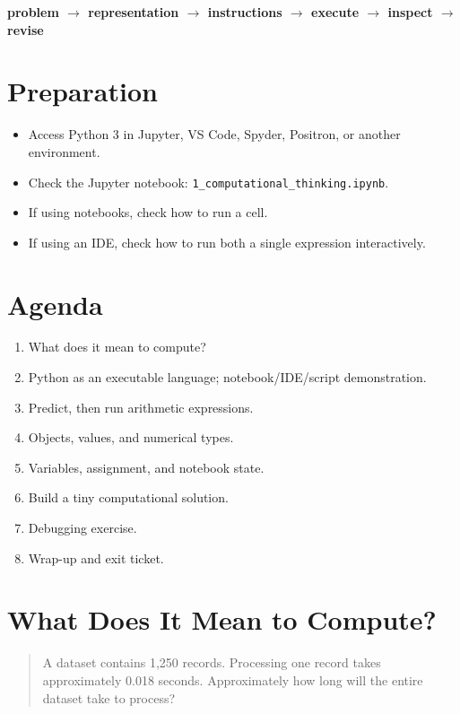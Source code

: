 \documentclass[11pt]{article}
\begin{document}
\begin{center}
\textbf{problem $\rightarrow$ representation $\rightarrow$ instructions $\rightarrow$ execute $\rightarrow$ inspect $\rightarrow$ revise}
\end{center}

\section*{Preparation}

\begin{itemize}
    \item Access Python 3 in Jupyter, VS Code, Spyder, Positron, or another environment.
    \item Check the Jupyter notebook:
    \texttt{1\_computational\_thinking.ipynb}.
    \item If using notebooks, check how to run a cell.
    \item If using an IDE, check how to run both a single expression interactively.
\end{itemize}

\section*{Agenda}

\begin{enumerate}
\item What does it mean to compute?
\item Python as an executable language; notebook/IDE/script demonstration.
\item Predict, then run arithmetic expressions.
\item Objects, values, and numerical types.
\item Variables, assignment, and notebook state.
\item Build a tiny computational solution.
\item Debugging exercise.
\item Wrap-up and exit ticket.
\end{enumerate}

\section{What Does It Mean to Compute?}

\begin{quote}
A dataset contains 1,250 records. Processing one record takes approximately 0.018 seconds. Approximately how long will the entire dataset take to process?
\end{quote}
\end{document}
